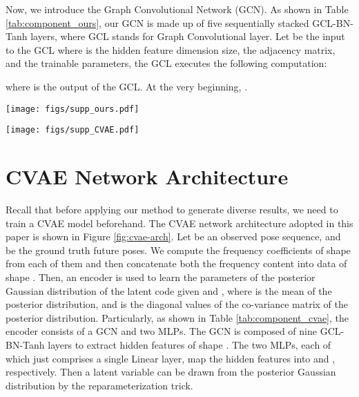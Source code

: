 \documentclass[sigconf,screen,nonacm]{acmart}
\begin{document}
	
	Now, we introduce the Graph Convolutional Network (GCN). As shown in Table \ref{tab:component_ours}, our GCN is made up of five sequentially stacked GCL-BN-Tanh layers, where GCL stands for Graph Convolutional layer. Let  be the input to the  GCL where  is the hidden feature dimension size,  the adjacency matrix, and  the trainable parameters, the GCL executes the following computation:
	
	where  is the output of the  GCL. At the very beginning, .
	
	
	\begin{figure*}[!t]
		\centering
		\texttt{[image: figs/supp\_ours.pdf]}\\
		\caption{Detailed architecture of our auxiliary-space-based sampling model. A circle represents input, intermediate, or output data. The symbol above a circle indicates the size of the data. For example, [, ] means the data is a two-dimensional matrix of  rows and  columns. The symbol above an arrow indicates the size of the output of the corresponding previous operator. Please refer to the main text for detailed descriptions of the architecture. }
\label{fig:our-arch}
	\end{figure*}
	
	\begin{figure*}[!t]
		\centering
		\texttt{[image: figs/supp\_CVAE.pdf]}\\
		\caption{Detailed architecture of the adopted CVAE model. It is composed of an encoder and a decoder that are built on GCNs and MLPs. Please refer to the main text for detailed descriptions of the architecture.}
\label{fig:cvae-arch}
	\end{figure*}
	
	
	\section{CVAE Network Architecture}
	Recall that before applying our method to generate diverse results, we need to train a CVAE model beforehand. The CVAE network architecture adopted in this paper is shown in Figure \ref{fig:cvae-arch}. 
	Let  be an observed pose sequence, and  be the ground truth future poses. We compute the frequency coefficients of shape  from each of them and then concatenate both the frequency content into data of shape .
	Then, an encoder is used to learn the parameters of the posterior Gaussian distribution  of the latent code  given  and , where  is the mean of the posterior distribution, and  is the diagonal values of the co-variance matrix of the posterior distribution.
	Particularly, as shown in Table \ref{tab:component_cvae}, the encoder consists of a GCN and two MLPs. The GCN is composed of nine GCL-BN-Tanh layers to extract hidden features of shape . The two MLPs, each of which just comprises a single Linear layer, map the hidden features into  and , respectively.
	Then a latent variable  can be drawn from the posterior Gaussian distribution by the reparameterization trick.
	
\end{document}
